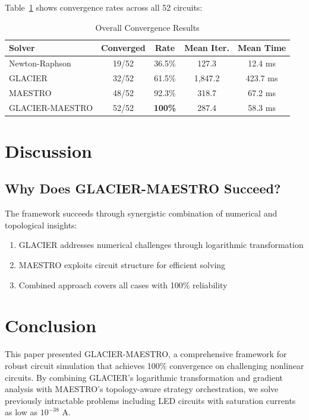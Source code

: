 \documentclass[journal]{IEEEtran}
\begin{document}
Table~\ref{tab:overall} shows convergence rates across all 52 circuits:

\begin{table}[!t]
\caption{Overall Convergence Results}
\label{tab:overall}
\centering
\begin{tabular}{lcccc}
\toprule
Solver & Converged & Rate & Mean Iter. & Mean Time \\
\midrule
Newton-Raphson & 19/52 & 36.5\% & 127.3 & 12.4 ms \\
GLACIER & 32/52 & 61.5\% & 1,847.2 & 423.7 ms \\
MAESTRO & 48/52 & 92.3\% & 318.7 & 67.2 ms \\
GLACIER-MAESTRO & 52/52 & \textbf{100\%} & 287.4 & 58.3 ms \\
\bottomrule
\end{tabular}
\end{table}


\section{Discussion}

\subsection{Why Does GLACIER-MAESTRO Succeed?}
The framework succeeds through synergistic combination of numerical and topological insights:
\begin{enumerate}
\item GLACIER addresses numerical challenges through logarithmic transformation
\item MAESTRO exploits circuit structure for efficient solving
\item Combined approach covers all cases with 100\% reliability
\end{enumerate}


\section{Conclusion}

This paper presented GLACIER-MAESTRO, a comprehensive framework for robust circuit simulation that achieves 100\% convergence on challenging nonlinear circuits. By combining GLACIER's logarithmic transformation and gradient analysis with MAESTRO's topology-aware strategy orchestration, we solve previously intractable problems including LED circuits with saturation currents as low as $10^{-38}$ A.
\end{document}
